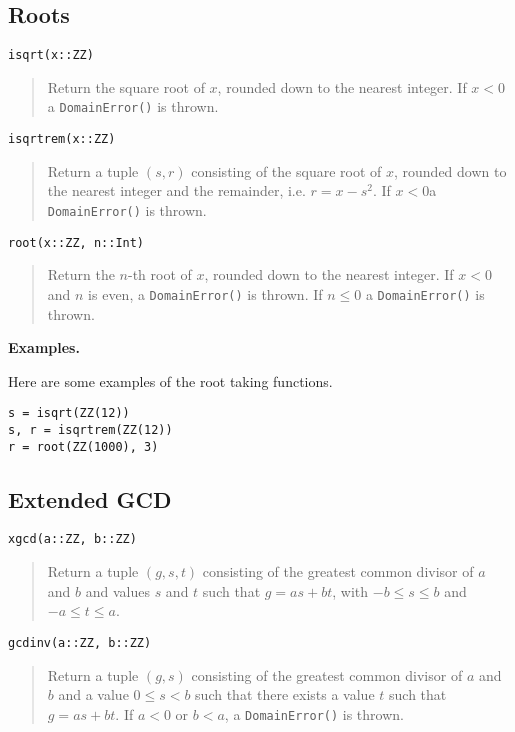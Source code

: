 \documentclass[a4paper,10pt]{article}
\newcommand{\code}{\lstinline}
\newcommand{\desc}[1]{\vspace{-3mm}\begin{quote}#1\end{quote}}
\begin{document}
{{{\subsection{Roots}

\begin{lstlisting}
isqrt(x::ZZ)
\end{lstlisting}

\desc{Return the square root of $x$, rounded down to the nearest integer. If $x < 0$
a \code{DomainError()} is thrown.}

\begin{lstlisting}
isqrtrem(x::ZZ)
\end{lstlisting}

\desc{Return a tuple $(s, r)$ consisting of the square root of $x$, rounded down to the 
nearest integer and the remainder, i.e. $r = x - s^2$. If $x < 0$a \code{DomainError()}
is thrown.}

\begin{lstlisting}
root(x::ZZ, n::Int)
\end{lstlisting}

\desc{Return the $n$-th root of $x$, rounded down to the nearest integer. If $x < 0$ and
$n$ is even, a \code{DomainError()} is thrown. If $n \leq 0$ a \code{DomainError()} is
thrown.}

\textbf{Examples.}

Here are some examples of the root taking functions.

\begin{lstlisting}
s = isqrt(ZZ(12))
s, r = isqrtrem(ZZ(12))
r = root(ZZ(1000), 3)
\end{lstlisting}

\subsection{Extended GCD}

\begin{lstlisting}
xgcd(a::ZZ, b::ZZ)
\end{lstlisting}

\desc{Return a tuple $(g, s, t)$ consisting of the greatest common divisor of $a$ and $b$
and values $s$ and $t$ such that $g = as + bt$, with $-b \leq s \leq b$ and 
$-a \leq t \leq a$.}

\begin{lstlisting}
gcdinv(a::ZZ, b::ZZ)
\end{lstlisting}

\desc{Return a tuple $(g, s)$ consisting of the greatest common divisor of $a$ and $b$
and a value $0 \leq s < b$ such that there exists a value $t$ such that 
$g = as + bt$. If $a < 0$ or $b < a$, a \code{DomainError()} is thrown.}

}}}
\end{document}
